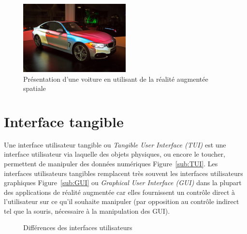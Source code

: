 \begin{figure}[H]
\centering
\includegraphics[width=0.5\textwidth]{images/SARMappingCar2}
\caption{Présentation d'une voiture en utilisant de la réalité augmentée spatiale\protect\footnotemark}
\label{fig:SAR}
\end{figure}

\section{Interface tangible}
Une interface utilisateur tangible\cite{ishii2008tangible} ou \emph{Tangible User Interface (TUI)} est une interface utilisateur via laquelle des objets physiques, ou encore le toucher, permettent de manipuler des données numériques Figure~\ref{sub:TUI}. Les interfaces utilisateurs tangibles remplacent très souvent les interfaces utilisateurs graphiques Figure~\ref{sub:GUI} ou \emph{Graphical User Interface (GUI)} dans la plupart des applications de réalité augmentée car elles fournissent un contrôle direct à l'utilisateur sur ce qu'il souhaite manipuler (par opposition au contrôle indirect tel que la souris, nécessaire à la manipulation des GUI).

\begin{figure}[H]
    \centering
\caption{Différences des interfaces utilisateurs\protect\footnotemark}
\label{fig:GUITUI}
\end{figure}

